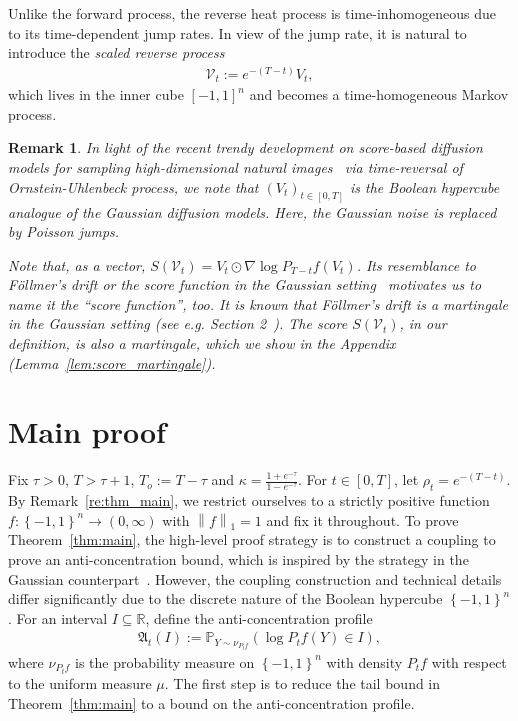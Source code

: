 \documentclass[11pt]{article}
\newcommand{\fA}{\mathfrak{A}}
\newcommand{\btau}{\kappa}
\newcommand{\uV}{V}
\newcommand{\To}{{T_o}}
\newcommand{\rV}{\mathscr{V}}
\theoremstyle{named}
\theoremstyle{plain}
\newtheorem{remark}{Remark}
\newcommand{\defn}{:=}
\newcommand{\real}{\ensuremath{\mathbb{R}}}
\newcommand{\Prob}{\ensuremath{{\mathbb{P}}}}
\newcommand{\parenth}[1]{\left( #1 \right)}
\newcommand{\braces}[1]{\left\{ #1 \right \}}
\newcommand{\vecnorm}[2]{\left\| #1\right\|_{#2}}
\begin{document}
Unlike the forward process, the reverse heat process is time-inhomogeneous due to its time-dependent jump rates. In view of the jump rate, it is natural to introduce the \textit{scaled reverse process}
\begin{align}
  \label{eq:def_scaled_reverse_jump_process}
  \rV_t \defn e^{-(T-t)} \uV_t, 
\end{align}
which lives in the inner cube $[-1,1]^n$ and becomes a time-homogeneous Markov process. 
\begin{remark}
  In light of the recent trendy development on score-based diffusion models for sampling high-dimensional natural images~\cite{song2021score} via time-reversal of Ornstein-Uhlenbeck process, we note that $(\uV_t)_{t \in [0, T]}$ is the Boolean hypercube analogue of the Gaussian diffusion models. Here, the Gaussian noise is replaced by Poisson jumps. 

  Note that, as a vector, $S(\rV_t) = \uV_t \odot \nabla \log P_{T-t} f (\uV_t)$. Its resemblance to F\"ollmer's drift or the score function in the Gaussian setting~\cite{eldan2018regularization} motivates us to name it the ``score function'', too. It is known that F\"ollmer's drift is a martingale in the Gaussian setting (see e.g. Section 2~\cite{eldan2018regularization}). The score $S(\rV_t)$, in our definition, is also a martingale, which we show in the Appendix (Lemma~\ref{lem:score_martingale}).
\end{remark}

\section{Main proof}
\label{sec:main_proof}
Fix $\tau > 0$, $T > \tau + 1$, $\To \defn T - \tau$ and $\btau = \frac{1+e^{-\tau}}{1-e^{-\tau}}$. For $t \in [0, T]$, let $\rho_t = e^{-(T-t)}$. By Remark~\ref{re:thm_main}, we restrict ourselves to a strictly positive function $f: \braces{-1, 1}^n \to (0, \infty)$ with $\vecnorm{f}{1} = 1$ and fix it throughout. To prove Theorem~\ref{thm:main}, the high-level proof strategy is to construct a coupling to prove an anti-concentration bound, which is inspired by the strategy in the Gaussian counterpart~\cite{eldan2018regularization}. However, the coupling construction and technical details differ significantly due to the discrete nature of the Boolean hypercube $\braces{-1,1}^n$. For an interval $I \subseteq \real$, define the anti-concentration profile
\begin{align}
  \label{eq:def_anti_concentration_profile}
  \fA_t(I) \defn \Prob_{Y \sim \nu_{P_t f} } \parenth{\log P_t f(Y) \in I},
\end{align}
where $\nu_{P_t f}$ is the probability measure on $\braces{-1,1}^n$ with density $P_t f$ with respect to the uniform measure $\mu$.
The first step is to reduce the tail bound in Theorem~\ref{thm:main} to a bound on the anti-concentration profile.
\end{document}
